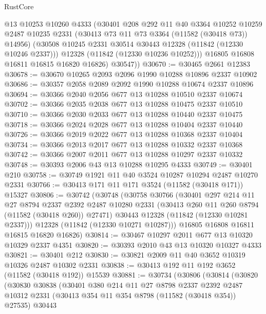 \begin{lexlean}{RustCore}
\begin{coremodule}
          @13
          @10253
          @10260
          @4333
          (@30401
            @208
            @292
            @11
            @40
            @3364
            @10252
            @10259
            @2487
            @10235
            @2331
            (@30413 @73 @11 @73 @3364 (@11582 (@30418 @73)) @14956)
            (@30508 @10245 @2331 @30514 @30443 @12328 (@11842 (@12330 @10246 @2337)))
            @12328
            (@11842 (@12330 @10236 @10252)))
          @16805
          @16808
          @16811
          @16815
          @16820
          @16826)
        @30547))
@30670 := @30465 @2661 @12383
@30678 := @30670 @10265 @2093 @2096 @1990 @10288 @10896 @2337 @10902
@30686 := @30357 @2058 @2089 @2092 @1990 @10288 @10674 @2337 @10896
@30694 := @30366 @2040 @2056 @677 @13 @10288 @10510 @2337 @10674
@30702 := @30366 @2035 @2038 @677 @13 @10288 @10475 @2337 @10510
@30710 := @30366 @2030 @2033 @677 @13 @10288 @10440 @2337 @10475
@30718 := @30366 @2024 @2028 @677 @13 @10288 @10404 @2337 @10440
@30726 := @30366 @2019 @2022 @677 @13 @10288 @10368 @2337 @10404
@30734 := @30366 @2013 @2017 @677 @13 @10288 @10332 @2337 @10368
@30742 := @30366 @2007 @2011 @677 @13 @10288 @10297 @2337 @10332
@30748 := @30393 @2006 @43 @13 @10288 @10295 @4333
@30749 := @30401 @210
@30758 := @30749 @1921 @11 @40 @3524 @10287 @10294 @2487 @10270 @2331
@30766 := @30413 @171 @11 @171 @3524 (@11582 (@30418 @171)) @15327
@30806 := @30742
    (@30748
      (@30758
        @30766
        (@30401
          @297
          @214
          @11
          @27
          @8794
          @2337
          @2392
          @2487
          @10280
          @2331
          (@30413 @260 @11 @260 @8794 (@11582 (@30418 @260)) @27471)
          @30443
          @12328
          (@11842 (@12330 @10281 @2337)))
        @12328
        (@11842 (@12330 @10271 @10287)))
      @16805
      @16808
      @16811
      @16815
      @16820
      @16826)
@30814 := @30467 @10297 @2011 @677 @13 @10320 @10329 @2337 @4351
@30820 := @30393 @2010 @43 @13 @10320 @10327 @4333
@30821 := @30401 @212
@30830 := @30821 @2009 @11 @40 @3652 @10319 @10326 @2487 @10302 @2331
@30838 := @30413 @192 @11 @192 @3652 (@11582 (@30418 @192)) @15539
@30881 := @30734
    (@30806
      (@30814
        (@30820
          (@30830
            @30838
            (@30401
              @380
              @214
              @11
              @27
              @8798
              @2337
              @2392
              @2487
              @10312
              @2331
              (@30413 @354 @11 @354 @8798 (@11582 (@30418 @354)) @27535)
              @30443

\end{coremodule}
\end{lexlean}
